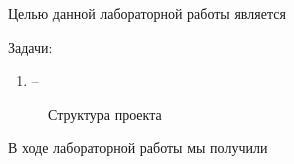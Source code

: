 
Целью данной лабораторной работы является 
\newline

Задачи:
\begin{enumerate}
	\item --
\end{enumerate}



\begin{figure}[!htbp]
	\centering
	\caption{Структура проекта}
\end{figure}
\FloatBarrier













%


В ходе лабораторной работы мы получили 